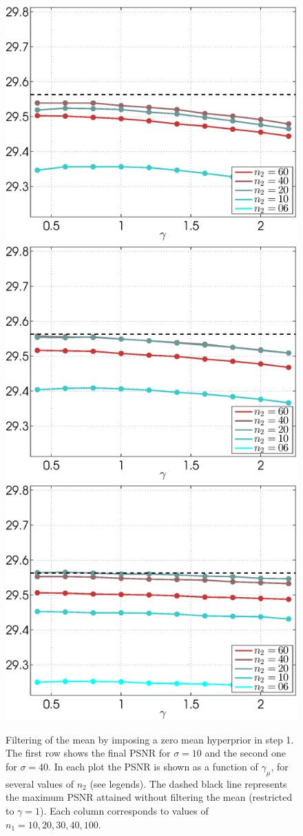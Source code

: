 \documentclass{ipol}
\begin{document}
\begin{figure}[ht!]
	\includegraphics[width=.2\textwidth]{f/nldct/WIE1muHWIE2-vs-WIE1WIE2_fpsnr_np2-g-curves_1np030_s40_average.eps}%
	\includegraphics[width=.2\textwidth]{f/nldct/WIE1muHWIE2-vs-WIE1WIE2_fpsnr_np2-g-curves_1np040_s40_average.eps}%
	\includegraphics[width=.2\textwidth]{f/nldct/WIE1muHWIE2-vs-WIE1WIE2_fpsnr_np2-g-curves_1np100_s40_average.eps}\\
                                         
	\caption{Filtering of the mean by imposing a zero mean hyperprior in step 1.
		The first row shows the final PSNR for $\sigma = 10$ and the second one
		for $\sigma = 40$. In each plot the PSNR is shown as a function of
		$\gamma_\mu$, for several values of $n_2$ (see legends).  The dashed
		black line represents the maximum PSNR attained without filtering the
		mean (restricted to $\gamma = 1$).  Each column corresponds to values of
		$n_1 = 10, 20, 30, 40, 100$. }
	\label{fig:mu-filtering-hyper}
\end{figure}
\end{document}

